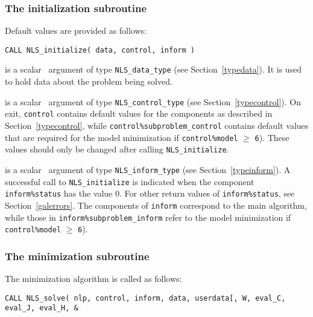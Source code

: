 \documentclass{galahad}
\newcommand{\packagename}{NLS}
\begin{document}

\subsubsection{The initialization subroutine}\label{subinit}
 Default values are provided as follows:
\vspace*{1mm}

\hspace{8mm}
{\tt CALL \packagename\_initialize( data, control, inform )}

\vspace*{-3mm}
\begin{description}

 is a scalar \intentinout\ argument of type
{\tt \packagename\_data\_type}
(see Section~\ref{typedata}). It is used to hold data about the problem being
solved.

 is a scalar \intentout\ argument of type
{\tt \packagename\_control\_type}
(see Section~\ref{typecontrol}).
On exit, {\tt control} contains default values for the components as
described in Section~\ref{typecontrol}, while
{\tt control\%subproblem\_control} contains default values that are required for the
model minimization if {\tt control\%model} $\geq$ {\tt 6}).
These values should only be changed after calling
{\tt \packagename\_initialize}.

 is a scalar \intentout\ argument of type
{\tt \packagename\_inform\_type}
(see Section~\ref{typeinform}). A successful call to
{\tt \packagename\_initialize}
is indicated when the  component {\tt inform\%status} has the value 0.
For other return values of {\tt inform\%status}, see
Section~\ref{galerrors}.
The components of {\tt inform} correspond to the main algorithm, while
those in {\tt inform\%subproblem\_inform} refer to the model minimization
if {\tt control\%model} $\geq$ {\tt 6}).

\end{description}


\subsubsection{The minimization subroutine}
The minimization algorithm is called as follows:
\vspace*{1mm}

\hspace{8mm}
{\tt CALL \packagename\_solve( nlp, control, inform, data, userdata[, W,
   eval\_C, eval\_J, eval\_H, \hspace{3mm}                  \&}
\vspace*{-5mm}
\end{document}
